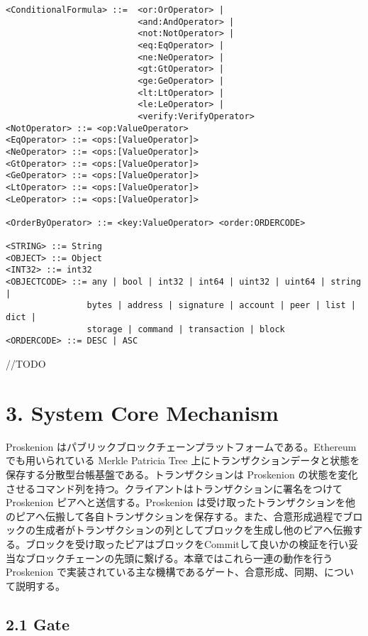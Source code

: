 \begin{verbatim}
<ConditionalFormula> ::=  <or:OrOperator> |
                          <and:AndOperator> |
                          <not:NotOperator> |
                          <eq:EqOperator> |
                          <ne:NeOperator> |
                          <gt:GtOperator> |
                          <ge:GeOperator> |
                          <lt:LtOperator> |
                          <le:LeOperator> |
                          <verify:VerifyOperator>
<NotOperator> ::= <op:ValueOperator>
<EqOperator> ::= <ops:[ValueOperator]>
<NeOperator> ::= <ops:[ValueOperator]>
<GtOperator> ::= <ops:[ValueOperator]>
<GeOperator> ::= <ops:[ValueOperator]>
<LtOperator> ::= <ops:[ValueOperator]>
<LeOperator> ::= <ops:[ValueOperator]>

<OrderByOperator> ::= <key:ValueOperator> <order:ORDERCODE>

<STRING> ::= String
<OBJECT> ::= Object
<INT32> ::= int32
<OBJECTCODE> ::= any | bool | int32 | int64 | uint32 | uint64 | string |
                bytes | address | signature | account | peer | list | dict |
                storage | command | transaction | block
<ORDERCODE> ::= DESC | ASC
\end{verbatim}

//TODO

\hypertarget{system-core-mechanism}{%
\section{3. System Core Mechanism}\label{system-core-mechanism}}

Proskenion はパブリックブロックチェーンプラットフォームである。Ethereum
でも用いられている Merkle Patricia Tree
上にトランザクションデータと状態を保存する分散型台帳基盤である。トランザクションは
Proskenion
の状態を変化させるコマンド列を持つ。クライアントはトランザクションに署名をつけて
Proskenion ピアへと送信する。Proskenion
は受け取ったトランザクションを他のピアへ伝搬して各自トランザクションを保存する。また、合意形成過程でブロックの生成者がトランザクションの列としてブロックを生成し他のピアへ伝搬する。ブロックを受け取ったピアはブロックをCommitして良いかの検証を行い妥当なブロックチェーンの先頭に繋げる。本章ではこれら一連の動作を行う
Proskenion
で実装されている主な機構であるゲート、合意形成、同期、について説明する。

\hypertarget{gate}{%
\subsection{2.1 Gate}\label{gate}}

